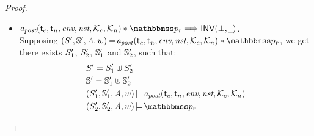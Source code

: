 \begin{proof}
\begin{itemize}
        \item $\Apost(\thrdid_c, \thrdid_n, \env, \nst, \hthrdlocalst_c, 
            \hthrdlocalst_n) \sepstar \relastP_r \Longrightarrow 
            \INV{(\primdone, \notCare)}$. \\
            Supposing 
            $\asrtmodel{(\state', \hpstate', \primcom, \word)}
                {\Apost(\tid_c, \tid_n, \env, \nst, \hthrdlocalst_c, 
                    \hthrdlocalst_n) \sepstar \relastP_r}$, we 
            get there exists $S_1'$, $S_2'$, $\mathbb{S}_1'$ 
            and $\mathbb{S}_2'$, such that: 
            \begin{align}
                & \state' = \state_1' \uplus \state_2' \\
                & \hpstate' = \hpstate_1' \uplus \hpstate_2' \\
                & \asrtmodel{(\state_1', \hpstate_1', \primcom, \word)}
                    {\Apost(\tid_c, \tid_n, \env, \nst, \hthrdlocalst_c, 
                        \hthrdlocalst_n)} \\
                & \asrtmodel{(\state_2', \hpstate_2', \primcom, \word)}
                    {\relastP_r}
            \end{align}


\end{itemize}
\end{proof}
